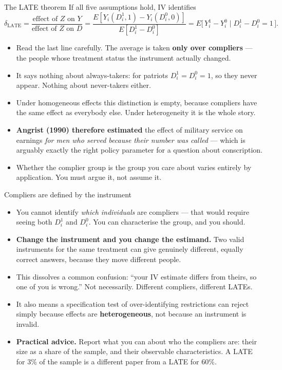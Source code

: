 \documentclass[
  11pt,
  ignorenonframetext,
  aspectratio=169,
]{beamer}
\providecommand{\tightlist}{%
  \setlength{\itemsep}{0pt}\setlength{\parskip}{0pt}}
\begin{document}
\begin{frame}{The LATE theorem}
\protect{}\label{the-late-theorem}
If all five assumptions hold, IV identifies \[
\delta_{\text{LATE}}
= \frac{\text{effect of } Z \text{ on } Y}{\text{effect of } Z \text{ on } D}
= \frac{E[Y_i(D^1_i,1) - Y_i(D^0_i,0)]}{E[D^1_i - D^0_i]}
= E\big[\,Y^1_i - Y^0_i \;\big|\; D^1_i - D^0_i = 1\,\big].
\]

\begin{itemize}
\tightlist
\item
  Read the last line carefully. The average is taken \textbf{only over
  compliers} --- the people whose treatment status the instrument
  actually changed.
\item
  It says nothing about always-takers: for patriots
  \(D^1_i = D^0_i = 1\), so they never appear. Nothing about
  never-takers either.
\item
  Under homogeneous effects this distinction is empty, because compliers
  have the same effect as everybody else. Under heterogeneity it is the
  whole story.
\item
  \textbf{Angrist (1990) therefore estimated} the effect of military
  service on earnings \emph{for men who served because their number was
  called} --- which is arguably exactly the right policy parameter for a
  question about conscription.
\item
  Whether the complier group is the group you care about varies entirely
  by application. You must argue it, not assume it.
\end{itemize}
\end{frame}

\begin{frame}{Compliers are defined by the instrument}
\protect{}\label{compliers-are-defined-by-the-instrument}
\begin{itemize}
\tightlist
\item
  You cannot identify \emph{which individuals} are compliers --- that
  would require seeing both \(D^1_i\) and \(D^0_i\). You can
  characterise the group, and you should.
\item
  \textbf{Change the instrument and you change the estimand.} Two valid
  instruments for the same treatment can give genuinely different,
  equally correct answers, because they move different people.
\item
  This dissolves a common confusion: ``your IV estimate differs from
  theirs, so one of you is wrong.'' Not necessarily. Different
  compliers, different LATEs.
\item
  It also means a specification test of over-identifying restrictions
  can reject simply because effects are \textbf{heterogeneous}, not
  because an instrument is invalid.
\item
  \textbf{Practical advice.} Report what you can about who the compliers
  are: their size as a share of the sample, and their observable
  characteristics. A LATE for 3\% of the sample is a different paper
  from a LATE for 60\%.
\end{itemize}
\end{frame}
\end{document}
